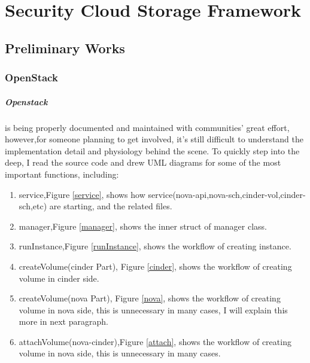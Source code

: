\documentclass[10pt]{report}
\begin{document}
	\chapter{Security Cloud Storage Framework}		
		\section{Preliminary Works}
			\subsection{OpenStack}			
			\paragraph{\large Openstack}
			 is being properly documented and maintained with communities' great effort, however,for someone planning to get involved, it's still difficult to understand the implementation detail and physiology behind the scene.
			To quickly step into the deep, I read the source code and drew UML diagrams for some of the most important functions, including:
			\begin{enumerate}
				\item service,Figure \ref{service}, shows how service(nova-api,nova-sch,cinder-vol,cinder-sch,etc) are starting, and the  related files.
				\item manager,Figure \ref{manager}, shows the inner struct of manager class.
				\item runInstance,Figure \ref{runInstance}, shows the workflow of creating instance.
				\item createVolume(cinder Part), Figure \ref{cinder}, shows the workflow of creating volume in cinder side.
				\item createVolume(nova Part), Figure \ref{nova}, shows the workflow of creating volume in nova side, this is unnecessary in many cases, I will explain this more in next paragraph.
				\item attachVolume(nova-cinder),Figure \ref{attach}, shows the workflow of creating volume in nova side, this is unnecessary in many cases.
			\end{enumerate}
\end{document}
